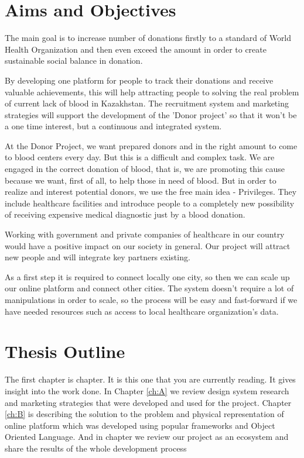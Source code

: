 \section{Aims and Objectives}
\par
The main goal is to increase number of donations firstly to a standard of World Health Organization and then even exceed the amount in order to create sustainable social balance in donation.
\par
By developing one platform for people to track their donations and receive valuable achievements, this will help attracting people to solving the real problem of current lack of blood in Kazakhstan. The recruitment system and marketing strategies will support the development of the 'Donor project' so that it won't be a one time interest, but a continuous and integrated system.
\par
At the Donor Project, we want prepared donors and in the right amount to come to blood centers every day. But this is a difficult and complex task. We are engaged in the correct donation of blood, that is, we are promoting this cause because we want, first of all, to help those in need of blood. But in order to realize and interest potential donors, we use the free main idea - Privileges. They include healthcare facilities and introduce people to a completely new possibility of receiving expensive medical diagnostic just by a blood donation.
\par
Working with government and private companies of healthcare in our country would have a positive impact on our society in general. Our project will attract new people and will integrate key partners existing.
\par
As a first step it is required to connect locally one city, so then we can scale up our online platform and connect other cities. The system doesn't require a lot of manipulations in order to scale, so the process will be easy and fast-forward if we have needed resources such as access to local healthcare organization's data.

\section{Thesis Outline}
The first chapter is  chapter. It is this one that you are currently reading. It gives insight into the work done. In Chapter \ref{ch:A} we review design system research and marketing strategies that were developed and used for the project. Chapter \ref{ch:B} is describing the solution to the problem and physical representation of online platform which was developed using popular frameworks and Object Oriented Language. And in  chapter we review our project as an ecosystem and share the results of the whole development process
